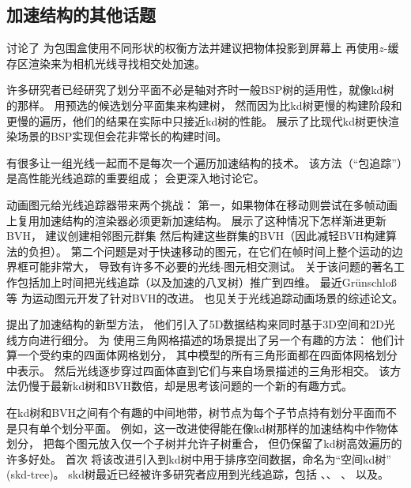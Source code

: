 \subsection{加速结构的其他话题}\label{sub:加速结构的其他话题}
\citet{10.1145/357332.357335}讨论了
为包围盒使用不同形状的权衡方法并建议把物体投影到屏幕上
再使用$z$-缓存区渲染来为相机光线寻找相交处加速。

许多研究者已经研究了划分平面不必是轴对齐时一般BSP树的适用性，就像kd树的那样。
\citet{4342591}用预选的候选划分平面集来构建树，
然而因为比kd树更慢的构建阶段和更慢的遍历，他们的结果在实际中只接近kd树的性能。
\citet{4634637}展示了比现代kd树更快渲染场景的BSP实现但会花非常长的构建时间。

有很多让一组光线一起而不是每次一个遍历加速结构的技术。
该方法（“包追踪”）是高性能光线追踪的重要组成；
会更深入地讨论它。

动画图元给光线追踪器带来两个挑战：
第一，如果物体在移动则尝试在多帧动画上复用加速结构的渲染器必须更新加速结构。
\citet{10.2312:egst.20071056}展示了这种情况下怎样渐进更新BVH，
\citet{10.1111/j.1467-8659.2009.01497.x}建议创建相邻图元群集
然后构建这些群集的BVH（因此减轻BVH构建算法的负担）。
第二个问题是对于快速移动的图元，在它们在帧时间上整个运动的边界框可能非常大，
导致有许多不必要的光线-图元相交测试。
关于该问题的著名工作包括\citet{504}加上时间把光线追踪（以及加速的八叉树）推广到四维。
最近Gr\"{u}nschlo\ss{}等\parencite*{10.1145/2018323.2018334}
为运动图元开发了针对BVH的改进。
也见\citet{10.2312:egst.20071056}关于光线追踪动画场景的综述论文。

\citet{10.1145/37401.37409}提出了加速结构的新型方法，
他们引入了5D数据结构来同时基于3D空间和2D光线方向进行细分。
\citet{10.1111/j.1467-8659.2008.01269.x}为
使用三角网格描述的场景提出了另一个有趣的方法：
他们计算一个受约束的四面体网格划分，
其中模型的所有三角形面都在四面体网格划分中表示。
然后光线逐步穿过四面体直到它们与来自场景描述的三角形相交。
该方法仍慢于最新kd树和BVH数倍，却是思考该问题的一个新的有趣方式。

在kd树和BVH之间有个有趣的中间地带，树节点为每个子节点持有划分平面而不是只有单个划分平面。
例如，这一改进使得能在像kd树那样的加速结构中作物体划分，
把每个图元放入仅一个子树并允许子树重合，
但仍保留了kd树高效遍历的许多好处。
\citet{10.1007/978-3-642-72617-0_17}首次
将该改进引入到kd树中用于排序空间数据，命名为“空间kd树”
(skd-tree)。
skd树最近已经被许多研究者应用到光线追踪，包括
\citet{10.1145/585740.585761}、\citet{10.1145/1283900.1283912}、
\citet{10.5555/2383894.2383912}、
\citet{4061548}以及\citet{2151237X.2006.10129224}。

